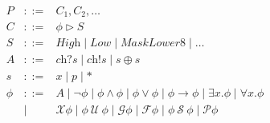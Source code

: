 \documentclass{entcs} \usepackage{entcsmacro}
\newcommand{\sch}{\textit{ch}}
\newcommand{\atom}{A}
\newcommand{\tr}{t\xspace}
\newcommand{\tnext}{\mathcal{X}}
\newcommand{\talways}{\mathcal{G}}
\newcommand{\tfuture}{\mathcal{F}}
\newcommand{\tuntil}{~\mathcal{U}~}
\newcommand{\tsince}{~\mathcal{S}~}
\newcommand{\tpast}{\mathcal{P}}
\newcommand{\limplies}{\rightarrow}
\begin{document}
\begin{figure}[!t]
  \small
  \begin{displaymath}
    \begin{array}{rcl}
      P & ::= & C_1, C_2, \ldots \\
      C & ::= & \phi \rhd S\\
      S & ::= & \textit{High} \mid \textit{Low} \mid
      \textit{MaskLower8} \mid \ldots \\ %
      \atom & ::= & \sch?s \mid \sch!s \mid s \oplus s \\
      s & ::= & x \mid p \mid \ast \\
      \phi & ::= &
      \atom
      \mid \neg \phi
      \mid \phi \wedge \phi
      \mid \phi \vee \phi
      \mid \phi \limplies \phi
      \mid \exists x.\phi 
      \mid \forall x.\phi \\
      & \mid &  \tnext \phi
      \mid \phi \tuntil \phi
      \mid \talways \phi 
      \mid \tfuture \phi 
      \mid \phi \tsince \phi
      \mid \tpast \phi
                         \\
    \end{array}
  \end{displaymath}

      




\end{figure}
\end{document}
